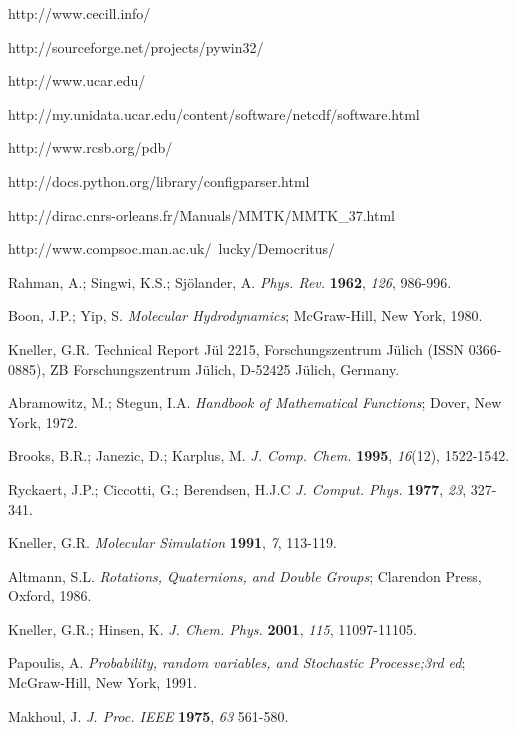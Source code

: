 \documentclass[a4paper,11pt]{report}
\begin{document}
\begin{thebibliography}{99}
 http://www.cecill.info/

 http://sourceforge.net/projects/pywin32/

 http://www.ucar.edu/

 http://my.unidata.ucar.edu/content/software/netcdf/software.html

 http://www.rcsb.org/pdb/

 http://docs.python.org/library/configparser.html

 http://dirac.cnrs-orleans.fr/Manuals/MMTK/MMTK\_37.html

 http://www.compsoc.man.ac.uk/~lucky/Democritus/

 Rahman, A.; Singwi, K.S.; Sj\"olander, A. \textit{Phys. Rev.} \textbf{1962}, \textit{126}, 986-996.

 Boon, J.P.; Yip, S. \textit{Molecular Hydrodynamics}; McGraw-Hill, New York, 1980.

 Kneller, G.R. Technical Report J\"ul 2215, Forschungs\-zen\-trum J\"u\-lich (ISSN 0366-0885), 
ZB Forschungs\-zen\-trum J\"ulich, D-52425 J\"ulich, Germany.

 Abramowitz, M.; Stegun, I.A. \textit{Handbook of Mathematical Functions}; Dover, New York, 1972.

 Brooks, B.R.; Janezic, D.; Karplus, M. \textit{J. Comp. Chem.} \textbf{1995}, \textit{16}(12), 1522-1542.

 Ryckaert, J.P.; Ciccotti, G.; Berendsen, H.J.C \textit{J. Comput. Phys.} \textbf{1977}, \textit{23}, 327-341.

 Kneller, G.R. \textit{Molecular Simulation} \textbf{1991}, \textit{7}, 113-119.

 Altmann, S.L. \textit{Rotations, Quaternions, and Double Groups}; Clarendon Press, Oxford, 1986.

 Kneller, G.R.; Hinsen, K. \textit{J. Chem. Phys.} \textbf{2001}, \textit{115}, 11097-11105.

 Papoulis, A. \textit{Probability, random variables, and Stochastic Processe;3rd ed}; McGraw-Hill, New York, 1991.

 Makhoul, J. \textit{J. Proc. IEEE} \textbf{1975}, \textit{63} 561-580.


\end{thebibliography}
\end{document}
